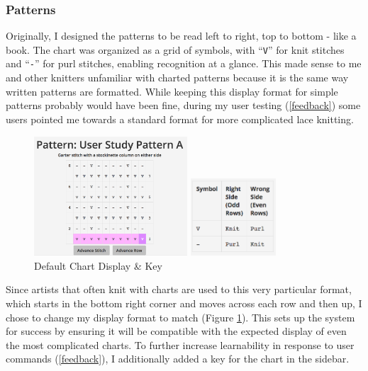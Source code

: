 \documentclass[11pt,twocolumn]{article}
\begin{document}
\subsubsection{Patterns} \label{pat-pivot}

Originally, I designed the patterns to be read left to right, top to bottom - like a book.
The chart was organized as a grid of symbols, with ``\texttt{V}'' for knit stitches and ``\texttt{-}'' for purl stitches, enabling recognition at a glance.
This made sense to me and other knitters unfamiliar with charted patterns because it is the same way written patterns are formatted.
While keeping this display format for simple patterns probably would have been fine, during my user testing (\ref{feedback}) some users pointed me towards a standard format for more complicated lace knitting.

\begin{figure}
  \begin{center}
    \includegraphics[width=2.25in]{finalCharted}

    \includegraphics[width=1.25in]{sideKey}
    \caption{Default Chart Display \& Key} \label{finalCharted}
  \end{center}
\end{figure}

Since artists that often knit with charts are used to this very particular format, which starts in the bottom right corner and moves across each row and then up, I chose to change my display format to match (Figure \ref{finalCharted}).
This sets up the system for success by ensuring it will be compatible with the expected display of even the most complicated charts.
To further increase learnability in response to user commands (\ref{feedback}), I additionally added a key for the chart in the sidebar.
\end{document}
